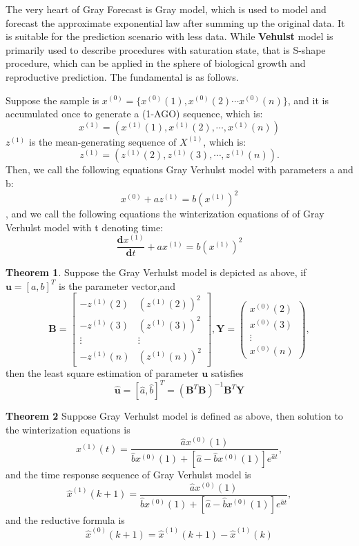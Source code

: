 \documentclass{mcmthesis}
\numberwithin{figure}{section}
\numberwithin{table}{section}
\numberwithin{equation}{section}
\begin{document}
The very heart of Gray Forecast is Gray model, which is used to model and 
forecast the approximate exponential law after summing up the 
original data. It is suitable for the prediction scenario with 
less data. While \textbf{Vehulst} model is primarily used to
describe procedures with saturation state, that is S-shape procedure,
which can be applied in the sphere of biological growth and reproductive prediction.
The fundamental is as follows.
\par
Suppose the sample is $ x^{(0)} = \{x^{(0)}(1), x^{(0)}(2) \cdots
x^{(0)}(n)\} $, and it is accumulated once to generate a 
(1-AGO) sequence, which is:
$$
  x^{(1)} = (x^{(1)}(1),x^{(1)}(2),\cdots, x^{(1)}(n))
$$ 
$ z^{(1)} $ is the mean-generating sequence of $ X^{(1)} $, which is:
$$
z^{(1)} = (z^{(1)}(2),z^{(1)}(3),\cdots,z^{(1)}(n)).
$$ 
Then, we call the following equations Gray Verhulst model with parameters a and b:
$$
  x^{(0)} + az^{(1)} = b(x^{(1)})^2
$$ 
, and we call the following equations the winterization equations of
of Gray Verhulst model with t denoting time:
$$
  \frac{\mathbf{d}x^{(1)}}{\mathbf{d}t} + ax^{(1)} = b(x^{(1)})^2
$$ 
\par
\textbf{Theorem 1}. Suppose the Gray Verhulst model is depicted as above, if
$ \bm{u} = [a,b]^T $  is the parameter vector,and 
$$
  \bm{B} = 
  \begin{bmatrix}
    -z^{(1)}(2) & (z^{(1)}(2))^2\\
    -z^{(1)}(3) & (z^{(1)}(3))^2\\
    \vdots & \vdots\\
    -z^{(1)}(n) & (z^{(1)}(n))^2
  \end{bmatrix},
  \bm{Y} = \left(
  \begin{array}{c}
    x^{(0)}(2)\\
    x^{(0)}(3)\\
    \vdots\\
    x^{(0)}(n)
  \end{array}\right),
$$
then the least square estimation of parameter $ \bm{u} $ satisfies
$$
  \hat{\bm{u}} = [\hat{a},\hat{b}]^T = (\bm{B}^T\bm{B})^{-1}\bm{B}^T\bm{Y}
$$ 

\textbf{Theorem 2}
Suppose Gray Verhulst model is defined as above, then solution to the winterization
equations is 
$$
  x^{(1)}(t) = \frac{\hat{a}x^{(0)}(1)}{\hat{b}x^{(0)}(1)+[\hat{a}-\hat{b}x^{(0)}(1)]e^{\hat{a}t}},
$$ 
and the time response sequence of Gray Verhulst model is
$$
  \hat{x}^{(1)}(k+1) = \frac{\hat{a}x^{(0)}(1)}{\hat{b}x^{(0)}(1)+[\hat{a}-\hat{b}x^{(0)}(1)]e^{\hat{a}t}},
$$ 
and the reductive formula is 
$$
  \hat{x}^{(0)}(k+1) = \hat{x}^{(1)}(k+1) - \hat{x}^{(1)}(k)
$$ 
\end{document}
